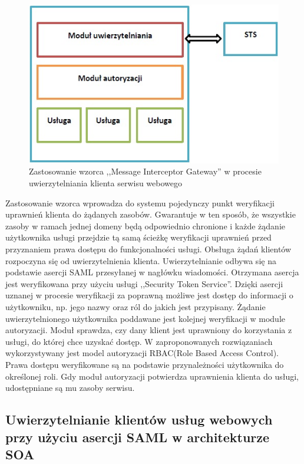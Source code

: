 		\begin{figure}[h]
			\centering
			\includegraphics{img/interceptorGateway.jpg}
			\caption{Zastosowanie wzorca ,,Message Interceptor Gateway'' w procesie uwierzytelniania klienta serwisu webowego}
			\label{Zastosowanie wzorca ,,Message Interceptor Gateway'' w procesie uwierzytelniania klienta serwisu webowego}
		\end{figure}

		Zastosowanie wzorca wprowadza do systemu pojedynczy punkt weryfikacji uprawnień klienta do żądanych zasobów. Gwarantuje w ten sposób, że wszystkie zasoby w ramach jednej domeny będą odpowiednio chronione i każde żądanie użytkownika usługi przejdzie tą samą ścieżkę weryfikacji uprawnień przed przyznaniem prawa dostępu do funkcjonalności usługi. Obsługa żądań klientów rozpoczyna się od uwierzytelnienia klienta. Uwierzytelnianie odbywa się na podstawie asercji SAML przesyłanej w nagłówku wiadomości. Otrzymana asercja jest weryfikowana przy użyciu usługi ,,Security Token Service''. Dzięki asercji uznanej w procesie weryfikacji za poprawną możliwe jest dostęp do informacji o użytkowniku, np. jego nazwy oraz ról do jakich jest przypisany. Żądanie uwierzytelnionego użytkownika poddawane jest kolejnej weryfikacji w module autoryzacji. Moduł sprawdza, czy dany klient jest uprawniony do korzystania z usługi, do której chce uzyskać dostęp. W zaproponowanych rozwiązaniach wykorzystywany jest model autoryzacji RBAC(Role Based Access Control). Prawa dostępu weryfikowane są na podstawie przynależności użytkownika do określonej roli. Gdy moduł autoryzacji potwierdza uprawnienia klienta do usługi, udostępniane są mu zasoby serwisu.

	\subsection{Uwierzytelnianie klientów usług webowych przy użyciu asercji SAML w architekturze SOA}


